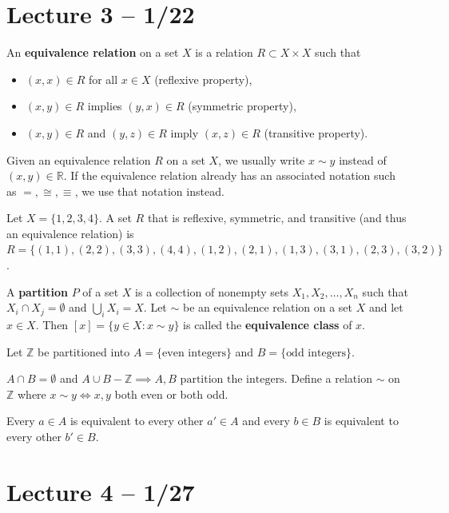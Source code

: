 \documentclass{article}
\newcommand{\R}{\mathbb{R}}
\newcommand{\Z}{\mathbb{Z}}
\begin{document}
\section{Lecture 3 -- 1/22}
\begin{definition}
  An \textbf{equivalence relation} on a set $X$ is a relation $R\subset X \times X$ such that
  \begin{itemize}
    \item $(x,x)\in R$ for all $x\in X$ (reflexive property),
    \item $(x,y)\in R$ implies $(y,x)\in R$ (symmetric property),
    \item $(x,y)\in R$ and $(y,z)\in R$ imply $(x,z)\in R$ (transitive property).
  \end{itemize}
  Given an equivalence relation $R$ on a set $X$, we usually write $x\sim y$ instead of $(x,y)\in\R$. If the equivalence relation already has an associated notation such as $=, \cong, \equiv$, we use that notation instead.
\end{definition}
\begin{example}
  Let $X=\{1, 2, 3, 4\}$. A set $R$ that is reflexive, symmetric, and transitive (and thus an equivalence relation) is $R=\{(1,1), (2,2), (3,3), (4,4), (1,2), (2,1), (1, 3), (3, 1), (2, 3), (3, 2)\}$.
\end{example}
\begin{definition}
  A \textbf{partition} $P$ of a set $X$ is a collection of nonempty sets $X_1, X_2, \ldots, X_n$ such that $X_i\cap X_j=\emptyset$ and $\bigcup_{i} X_i = X$. Let $\sim$ be an equivalence relation on a set $X$ and let $x\in X$. Then $[x]=\{y\in X:x\sim y\}$ is called the \textbf{equivalence class} of $x$.
\end{definition}
\begin{example}
  Let $\Z$ be partitioned into $A=\{\text{even integers}\}$ and $B=\{\text{odd integers}\}$.

  $A\cap B=\emptyset$ and $A\cup B-\Z\implies A,B\text{ partition the integers}$. Define a relation $\sim$ on $\Z$ where $x\sim y\iff x,y$ both even or both odd.

  Every $a\in A$ is equivalent to every other $a'\in A$ and every $b\in B$ is equivalent to every other $b'\in B$.

\end{example}

\section{Lecture 4 -- 1/27}
\end{document}

